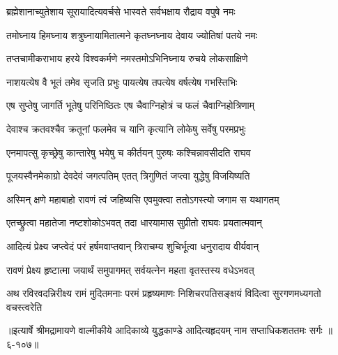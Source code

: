 \twolineshloka
{ब्रह्मेशानाच्युतेशाय सूरायादित्यवर्चसे}
{भास्वते सर्वभक्षाय रौद्राय वपुषे नमः} %

\twolineshloka
{तमोघ्नाय हिमघ्नाय शत्रुघ्नायामितात्मने}
{कृतघ्नघ्नाय देवाय ज्योतिषां पतये नमः} %

\twolineshloka
{तप्तचामीकराभाय हरये विश्वकर्मणे}
{नमस्तमोऽभिनिघ्नाय रुचये लोकसाक्षिणे} %

\twolineshloka
{नाशयत्येष वै भूतं तमेव सृजति प्रभुः}
{पायत्येष तपत्येष वर्षत्येष गभस्तिभिः} %

\twolineshloka
{एष सुप्तेषु जागर्ति भूतेषु परिनिष्ठितः}
{एष चैवाग्निहोत्रं च फलं चैवाग्निहोत्रिणाम्} %

\twolineshloka
{देवाश्च क्रतवश्चैव क्रतूनां फलमेव च}
{यानि कृत्यानि लोकेषु सर्वेषु परमप्रभुः} %

\twolineshloka
{एनमापत्सु कृच्छ्रेषु कान्तारेषु भयेषु च}
{कीर्तयन् पुरुषः कश्चिन्नावसीदति राघव} %

\twolineshloka
{पूजयस्वैनमेकाग्रो देवदेवं जगत्पतिम्}
{एतत् त्रिगुणितं जप्त्वा युद्धेषु विजयिष्यति} %

\twolineshloka
{अस्मिन् क्षणे महाबाहो रावणं त्वं जहिष्यसि}
{एवमुक्त्वा ततोऽगस्त्यो जगाम स यथागतम्} %

\twolineshloka
{एतच्छ्रुत्वा महातेजा नष्टशोकोऽभवत् तदा}
{धारयामास सुप्रीतो राघवः प्रयतात्मवान्} %

\twolineshloka
{आदित्यं प्रेक्ष्य जप्त्वेदं परं हर्षमवाप्तवान्}
{त्रिराचम्य शुचिर्भूत्वा धनुरादाय वीर्यवान्} %

\twolineshloka
{रावणं प्रेक्ष्य हृष्टात्मा जयार्थं समुपागमत्}
{सर्वयत्नेन महता वृतस्तस्य वधेऽभवत्} %

\twolineshloka
{अथ रविरवदन्निरीक्ष्य रामं मुदितमनाः परमं प्रहृष्यमाणः}
{निशिचरपतिसङ्क्षयं विदित्वा सुरगणमध्यगतो वचस्त्वरेति} %


॥इत्यार्षे श्रीमद्रामायणे वाल्मीकीये आदिकाव्ये युद्धकाण्डे आदित्यहृदयम् नाम सप्ताधिकशततमः सर्गः ॥६-१०७॥
